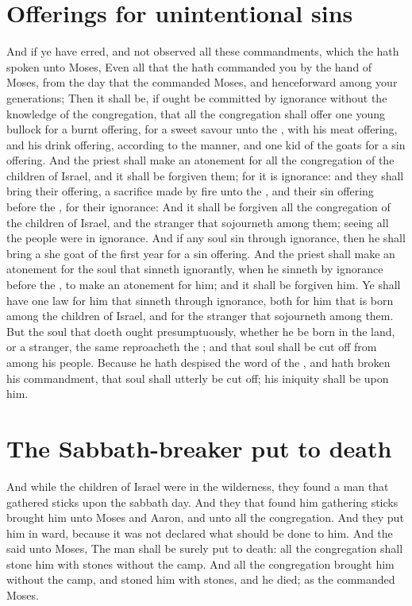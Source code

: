 \begin{biblechapter}
\section*{Offerings for unintentional sins}
\verse And if ye have erred, and not observed all these commandments, which the \LORD hath spoken unto Moses,
\verse Even all that the \LORD hath commanded you by the hand of Moses, from the day that the \LORD commanded Moses, and henceforward among your generations;
\verse Then it shall be, if ought be committed by ignorance without the knowledge of the congregation, that all the congregation shall offer one young bullock for a burnt offering, for a sweet savour unto the \LORD, with his meat offering, and his drink offering, according to the manner, and one kid of the goats for a sin offering.
\verse And the priest shall make an atonement for all the congregation of the children of Israel, and it shall be forgiven them; for it is ignorance: and they shall bring their offering, a sacrifice made by fire unto the \LORD, and their sin offering before the \LORD, for their ignorance:
\verse And it shall be forgiven all the congregation of the children of Israel, and the stranger that sojourneth among them; seeing all the people were in ignorance.
\verse And if any soul sin through ignorance, then he shall bring a she goat of the first year for a sin offering.
\verse And the priest shall make an atonement for the soul that sinneth ignorantly, when he sinneth by ignorance before the \LORD, to make an atonement for him; and it shall be forgiven him.
\verse Ye shall have one law for him that sinneth through ignorance, both for him that is born among the children of Israel, and for the stranger that sojourneth among them.
\verse But the soul that doeth ought presumptuously, whether he be born in the land, or a stranger, the same reproacheth the \LORD; and that soul shall be cut off from among his people.
\verse Because he hath despised the word of the \LORD, and hath broken his commandment, that soul shall utterly be cut off; his iniquity shall be upon him.
\section*{The Sabbath-breaker put to death}
\verse And while the children of Israel were in the wilderness, they found a man that gathered sticks upon the sabbath day.
\verse And they that found him gathering sticks brought him unto Moses and Aaron, and unto all the congregation.
\verse And they put him in ward, because it was not declared what should be done to him.
\verse And the \LORD said unto Moses, The man shall be surely put to death: all the congregation shall stone him with stones without the camp.
\verse And all the congregation brought him without the camp, and stoned him with stones, and he died; as the \LORD commanded Moses.

\end{biblechapter}
